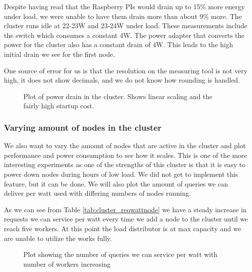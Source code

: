 Despite having read that the Raspberry PIs would drain up to 15\% more energy under load, we were unable to have them drain more than about 9\% more. The cluster runs idle at 22-23W and 23-24W under load. These measurements include the switch which consumes a constant 4W. The power adapter that converts the power for the cluster also has a constant drain of 4W. This leads to the high initial drain we see for the first node.

One source of error for us is that the resolution on the measuring tool is not very high, it does not show decimals, and we do not know how rounding is handled.

\begin{figure}[!h]
\centering
	\caption{Plot of power drain in the cluster. Shows linear scaling and the fairly high startup cost.}
\end{figure}

\subsubsection{Varying amount of nodes in the cluster}
We also want to vary the amount of nodes that are active in the cluster and plot performance and power consumption to see how it scales.
This is one of the more interesting experiments as one of the strengths of this cluster is that it is easy to power down nodes during hours of low load. We did not get to implement this feature, but it can be done. We will also plot the amount of queries we can deliver per watt used with differing numbers of nodes running.

As we can see from Table \ref{tab:cluster_reqwattnode} we have a steady increase in requests we can service per watt every time we add a node to the cluster until we reach five workers. At this point the load distributor is at max capacity and we are unable to utilize the works fully.

\begin{figure}[!h]
\centering
	\caption{Plot showing the number of queries we can service per watt with number of workers increasing}
\end{figure}

